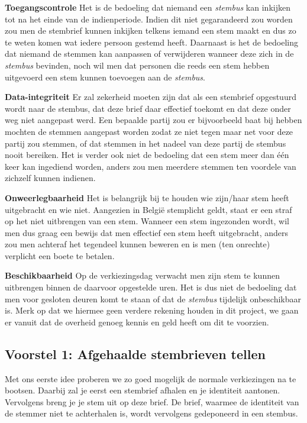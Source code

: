 \documentclass[a4paper,12pt]{article}
\begin{document}
\textbf{Toegangscontrole} Het is de bedoeling dat niemand een \emph{stembus} kan
inkijken tot na het einde van de indienperiode. Indien dit niet gegarandeerd
zou worden zou men de stembrief kunnen inkijken telkens iemand een stem maakt
en dus zo te weten komen wat iedere persoon gestemd heeft. Daarnaast is het de
bedoeling dat niemand de stemmen kan aanpassen of verwijderen wanneer deze zich
in de \emph{stembus} bevinden, noch wil men dat personen die reeds een stem
hebben uitgevoerd een stem kunnen toevoegen aan de \emph{stembus}.

\textbf{Data-integriteit} Er zal zekerheid moeten zijn dat als een stembrief
opgestuurd wordt naar de stembus, dat deze brief daar effectief toekomt en dat
deze onder weg niet aangepast werd. Een bepaalde partij zou er bijvoorbeeld
baat bij hebben mochten de stemmen aangepast worden zodat ze niet tegen maar
net voor deze partij zou stemmen, of dat stemmen in het nadeel van deze partij
de stembus nooit bereiken. Het is verder ook niet de bedoeling dat een stem
meer dan \'e\'en keer kan ingediend worden, anders zou men meerdere stemmen ten
voordele van zichzelf kunnen indienen.

\textbf{Onweerlegbaarheid} Het is belangrijk bij te houden wie zijn/haar
stem heeft uitgebracht en wie niet. Aangezien in Belgi\"e stemplicht geldt,
staat er een straf op het niet uitbrengen van een stem. Wanneer een stem
ingezonden wordt, wil men dus graag een bewijs dat men effectief een stem heeft
uitgebracht, anders zou men achteraf het tegendeel kunnen beweren en is men (ten
onrechte) verplicht een boete te betalen.

\textbf{Beschikbaarheid} Op de verkiezingsdag verwacht men zijn stem te kunnen
uitbrengen binnen de daarvoor opgestelde uren. Het is dus niet de bedoeling
dat men voor gesloten deuren komt te staan of dat de \emph{stembus} tijdelijk
onbeschikbaar is. Merk op dat we hiermee geen verdere rekening houden in dit
project, we gaan er vanuit dat de overheid genoeg kennis en geld heeft om dit te
voorzien.

\subsection{Voorstel 1: Afgehaalde stembrieven tellen}

Met ons eerste idee proberen we zo goed mogelijk de normale verkiezingen na te
bootsen. Daarbij zal je eerst een stembrief afhalen en je identiteit aantonen.
Vervolgens breng je je stem uit op deze brief. De brief, waarmee de identiteit
van de stemmer niet te achterhalen is, wordt vervolgens gedeponeerd in een
stembus.
\end{document}
